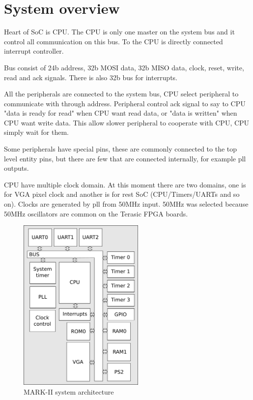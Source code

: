 \section{System overview}

Heart of SoC is CPU. The CPU is only one master on the system bus and it control
all communication on this bus. To the CPU is directly connected interrupt
controller.

Bus consist of 24b address, 32b MOSI data, 32b MISO data, clock, reset, write,
read and ack signals. There is also 32b bus for interrupts.

All the peripherals are connected to the system bus, CPU select peripheral to
communicate with through address. Peripheral control ack signal to say to CPU
"data is ready for read" when CPU want read data, or "data is written" when CPU
want write data. This allow slower peripheral to cooperate with CPU, CPU simply
wait for them.

Some peripherals have special pins, these are commonly connected to the top
level entity pins, but there are few that are connected internally, for example
pll outputs.

CPU have multiple clock domain. At this moment there are two domains, one is for
VGA pixel clock and another is for rest SoC (CPU/Timers/UARTs and so on).
Clocks are generated by pll from 50MHz input. 50MHz was selected because 50MHz
oscillators are common on the Terasic FPGA boards.

\begin{figure}
    \centering
    \includegraphics[width=0.55\textwidth]{img/MARK_II.png}
    \caption{MARK-II system architecture}
    \label{fig:sysarch}
\end{figure}

